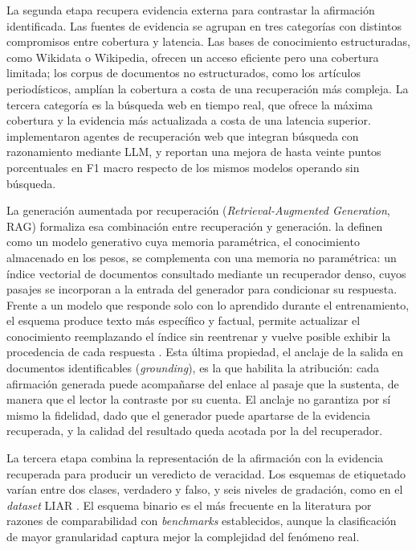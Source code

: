 La segunda etapa recupera evidencia externa para contrastar la afirmación identificada. Las fuentes de evidencia se agrupan en tres categorías con distintos compromisos entre cobertura y latencia. Las bases de conocimiento estructuradas, como Wikidata o Wikipedia, ofrecen un acceso eficiente pero una cobertura limitada; los corpus de documentos no estructurados, como los artículos periodísticos, amplían la cobertura a costa de una recuperación más compleja. La tercera categoría es la búsqueda web en tiempo real, que ofrece la máxima cobertura y la evidencia más actualizada a costa de una latencia superior. \textcite{TianEtAl2024} implementaron agentes de recuperación web que integran búsqueda con razonamiento mediante LLM, y reportan una mejora de hasta veinte puntos porcentuales en F1 macro respecto de los mismos modelos operando sin búsqueda.

La generación aumentada por recuperación (\textit{Retrieval-Augmented Generation}, RAG) formaliza esa combinación entre recuperación y generación. \textcite{LewisEtAl2020} la definen como un modelo generativo cuya memoria paramétrica, el conocimiento almacenado en los pesos, se complementa con una memoria no paramétrica: un índice vectorial de documentos consultado mediante un recuperador denso, cuyos pasajes se incorporan a la entrada del generador para condicionar su respuesta. Frente a un modelo que responde solo con lo aprendido durante el entrenamiento, el esquema produce texto más específico y factual, permite actualizar el conocimiento reemplazando el índice sin reentrenar y vuelve posible exhibir la procedencia de cada respuesta \parencite{LewisEtAl2020}. Esta última propiedad, el anclaje de la salida en documentos identificables (\textit{grounding}), es la que habilita la atribución: cada afirmación generada puede acompañarse del enlace al pasaje que la sustenta, de manera que el lector la contraste por su cuenta. El anclaje no garantiza por sí mismo la fidelidad, dado que el generador puede apartarse de la evidencia recuperada, y la calidad del resultado queda acotada por la del recuperador.

La tercera etapa combina la representación de la afirmación con la evidencia recuperada para producir un veredicto de veracidad. Los esquemas de etiquetado varían entre dos clases, verdadero y falso, y seis niveles de gradación, como en el \textit{dataset} LIAR \parencite{Wang2017}. El esquema binario es el más frecuente en la literatura por razones de comparabilidad con \textit{benchmarks} establecidos, aunque la clasificación de mayor granularidad captura mejor la complejidad del fenómeno real.

